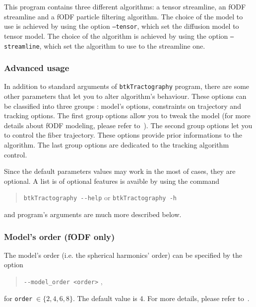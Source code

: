         This program contains three different algorithms: a tensor streamline, an fODF streamline and a fODF particle filtering algorithm. The choice of the model to use is achieved by using the option \texttt{--tensor}, which set the diffusion model to tensor model. The choice of the algorithm is achieved by using the option \texttt{--streamline}, which set the algorithm to use to the streamline one.

    \subsubsection*{Advanced usage}
        In addition to standard arguments of \texttt{btkTractography} program, 
        there are some other parameters that let you to alter algorithm's
behaviour. These options can be classified into three groups : model's options,
constraints on trajectory and tracking options. The first group options allow
you to tweak the model (for more details about fODF modeling, please refer
to~\cite{descoteaux_regularized_2007}). The second group options let you to
control the fiber trajectory. These options provide prior informations to
the algorithm. The last group options are dedicated to the tracking algorithm
control.

        Since the default parameters values may work in the most of cases, they 
        are optional. A list is of optional features is avaible by using the
command
            \begin{quote}
                \texttt{btkTractography -\hspace{0.1mm}-help} \hspace{0.5mm} or 
                \hspace{0.5mm} \texttt{btkTractography -h}
            \end{quote}
        and program's arguments are much more described below.


    \subsubsection*{Model's order (fODF only)}
        The model's order (i.e. the spherical harmonics' order) can be specified
        by the option
            \begin{quote}
                \texttt{-\hspace{0.1mm}-model\_order <order>} \enspace ,
            \end{quote}
        for \texttt{order}$\;\in\{2,4,6,8\}$. The default value is 4. For more 
        details, please refer to~\cite{descoteaux_regularized_2007}.

